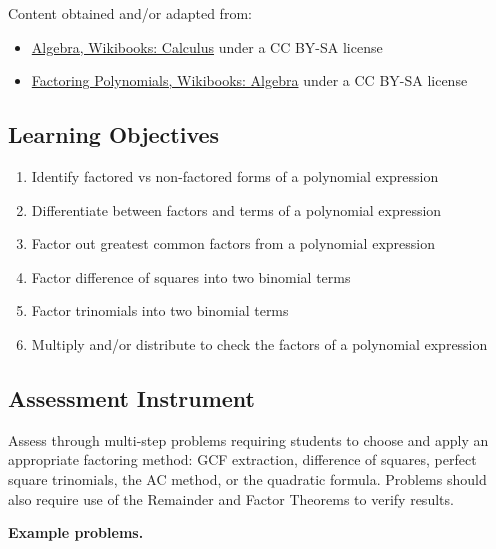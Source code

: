 Content obtained and/or adapted from:

\begin{itemize}
    \item \href{https://en.wikibooks.org/wiki/Calculus/Algebra}{Algebra, Wikibooks: Calculus} under a CC BY-SA license
    \item \href{https://en.wikibooks.org/wiki/Algebra/Factoring_Polynomials}{Factoring Polynomials, Wikibooks: Algebra} under a CC BY-SA license
\end{itemize}

\subsection{Learning Objectives}
\label{ssec:lear-30ae}

\begin{enumerate}
    \item Identify factored vs non-factored forms of a polynomial expression
    \item Differentiate between factors and terms of a polynomial expression
    \item Factor out greatest common factors from a polynomial expression
    \item Factor difference of squares into two binomial terms
    \item Factor trinomials into two binomial terms
    \item Multiply and/or distribute to check the factors of a polynomial expression
\end{enumerate}

\subsection{Assessment Instrument}
\label{ssec:asse-d43e}

Assess through multi-step problems requiring students to choose and apply an appropriate
factoring method: GCF extraction, difference of squares, perfect square trinomials, the AC
method, or the quadratic formula. Problems should also require use of the Remainder and
Factor Theorems to verify results.

\textbf{Example problems.}

